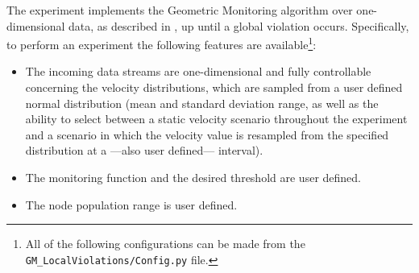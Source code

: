 \documentclass{article}
\begin{document}
			The experiment implements the Geometric Monitoring algorithm over one-dimensional data, as described in \cite{SharfmanSchusterKeren06}, up until a global violation occurs. Specifically, to perform an experiment the following features are available\footnote{All of the following configurations can be made from the \texttt{GM\_LocalViolations/Config.py} file.}:
			\begin{itemize}
			 	\item The incoming data streams are one-dimensional and fully controllable concerning the velocity distributions, which are sampled from a user defined normal distribution (mean and standard deviation range, as well as the ability to select between a static velocity scenario throughout the experiment and a scenario in which the velocity value is resampled from the specified distribution at a ---also user defined--- interval).
			 	\item The monitoring function and the desired threshold are user defined.
			 	\item The node population range is user defined.  
			\end{itemize}
			
\end{document}
